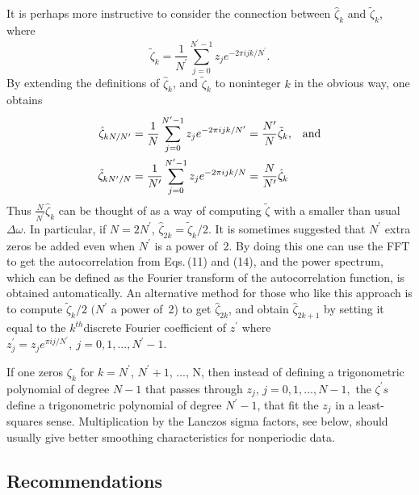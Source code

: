 \documentclass[twoside]{MATH77}
\begin{document}
It is perhaps more instructive to consider the connection between $\hat
\zeta _k$ and $\tilde \zeta _k$, where
\begin{equation}\label{O60}
\tilde \zeta _k=\frac 1{N^{\prime }}\sum_{j=0}^{N^{\prime
}-1}z_je^{-2\pi ijk/N^{\prime }}.
\end{equation}
By extending the definitions of $\hat \zeta _k$, and $\tilde \zeta _k$ to
noninteger $k$ in the obvious way, one obtains
\begin{equation}\label{O61}
\begin{split}
\hat \zeta _{kN/N^{\prime }}&=\frac 1N\sum_{j=0}^{N^{\prime
}-1}z_je^{-2\pi ijk/N^{\prime }}=\frac{N^{\prime }}N\tilde \zeta _k
\text{,\quad and}\\
\tilde \zeta _{kN^{\prime }/N}&=\frac 1{N^{\prime }}
\sum_{j=0}^{N^{\prime }-1}z_je^{-2\pi ijk/N}=\frac N{N^{\prime }}
\hat \zeta _k
\end{split}
\end{equation}
Thus $\frac N{N^{\prime }}\hat \zeta _k$ can be thought of as a way
of computing $\tilde \zeta $ with a smaller than usual $\Delta \omega
$. In particular, if $N=2N^{\prime }$, $\hat \zeta _{2k}=\tilde \zeta
_k/2.$ It is sometimes suggested that $N^{\prime }$ extra zeros be
added even when $N^{\prime }$ is a power of~2. By doing this one
can use the FFT to get the autocorrelation from Eqs.\,(11) and (14),
and the power spectrum, which can be defined as the Fourier transform
of the autocorrelation function, is obtained automatically. An
alternative method for those who like this approach is to compute
$\tilde \zeta _k/2$ $(N^{\prime }$ a power of~2) to get $\hat \zeta
_{2k}$, and obtain $\hat \zeta _{2k+1}$ by setting it equal to the
$k^{th}$discrete Fourier coefficient of $z^{\prime }$ where
$z_j^{\prime }=z_je^{\pi ij/N^{\prime }},\ j=0,1,...,N^{\prime }-1.$

If one zeros $\zeta _k$ for $k=N^{\prime }$, $N^{\prime }+1$, ..., N, then
instead of defining a trigonometric polynomial of degree $N-1$ that passes
through $z_j$, $j=0,1,...,N-1,$ the $\zeta ^{\prime }s$ define a
trigonometric polynomial of degree $N^{\prime }-1$, that fit the $z_j$ in a
least-squares sense. Multiplication by the Lanczos sigma factors, see below,
should usually give better smoothing characteristics for nonperiodic data.

\subsection{Recommendations}
\end{document}
